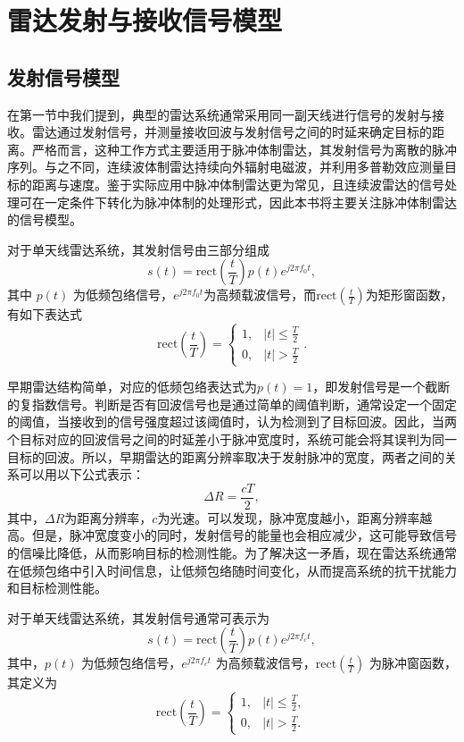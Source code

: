 \chapter{雷达发射与接收信号模型}

\section{发射信号模型}
在第一节中我们提到，典型的雷达系统通常采用同一副天线进行信号的发射与接收。雷达通过发射信号，并测量接收回波与发射信号之间的时延来确定目标的距离。严格而言，这种工作方式主要适用于脉冲体制雷达，其发射信号为离散的脉冲序列。与之不同，连续波体制雷达持续向外辐射电磁波，并利用多普勒效应测量目标的距离与速度。鉴于实际应用中脉冲体制雷达更为常见，且连续波雷达的信号处理可在一定条件下转化为脉冲体制的处理形式，因此本书将主要关注脉冲体制雷达的信号模型。

对于单天线雷达系统，其发射信号由三部分组成
\[
    s(t) = \text{rect}\left(\frac{t}{T}\right) p(t) e^{j 2 \pi f_0 t},
\]
其中 \( p(t) \) 为低频包络信号，\( e^{j 2 \pi f_0 t} \)为高频载波信号，而\( \text{rect}\left(\frac{t}{T}\right) \)为矩形窗函数，有如下表达式
\[
    \text{rect}\left(\frac{t}{T}\right) =
    \begin{cases}
        1, & |t| \leq \frac{T}{2} \\
        0, & |t| > \frac{T}{2}
    \end{cases}.
\]

早期雷达结构简单，对应的低频包络表达式为\( p(t) = 1 \)，即发射信号是一个截断的复指数信号。判断是否有回波信号也是通过简单的阈值判断，通常设定一个固定的阈值，当接收到的信号强度超过该阈值时，认为检测到了目标回波。因此，当两个目标对应的回波信号之间的时延差小于脉冲宽度时，系统可能会将其误判为同一目标的回波。所以，早期雷达的距离分辨率取决于发射脉冲的宽度，两者之间的关系可以用以下公式表示：
\[
    \Delta R = \frac{cT}{2},
\]
其中，\( \Delta R \)为距离分辨率，\( c \)为光速。可以发现，脉冲宽度越小，距离分辨率越高。但是，脉冲宽度变小的同时，发射信号的能量也会相应减少，这可能导致信号的信噪比降低，从而影响目标的检测性能。为了解决这一矛盾，现在雷达系统通常在低频包络中引入时间信息，让低频包络随时间变化，从而提高系统的抗干扰能力和目标检测性能。

对于单天线雷达系统，其发射信号通常可表示为
\begin{equation}
    s(t) = \text{rect}\left(\frac{t}{T}\right) p(t) e^{j 2 \pi f_c t},
\end{equation}
其中，$p(t)$ 为低频包络信号，$e^{j 2 \pi f_c t}$ 为高频载波信号，$\text{rect}\left(\frac{t}{T}\right)$ 为脉冲窗函数，其定义为
\begin{equation}
    \text{rect}\left(\frac{t}{T}\right) =
    \begin{cases}
        1, & |t| \leq \frac{T}{2}, \\
        0, & |t| > \frac{T}{2}.
    \end{cases}
\end{equation}

